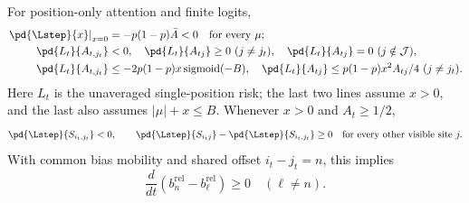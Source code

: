 \begin{lemma}
\label{lem:lr-signs}\label{lem:lr-postrouting-gradient}
For position-only attention and finite logits,
\begin{align}
 \left.\pd{\Lstep}{x}\right|_{x=0}&=-p(1-p)\bar A<0
 \quad\text{for every }\mu;\label{eq:lr-initial-gate-gradient}\\
 \pd{L_t}{A_{t,j_t}}&<0,\quad \pd{L_t}{A_{tj}}\ge0\ (j\ne j_t),
 \quad \pd{L_t}{A_{tj}}=0\ (j\notin\mathcal J),\label{eq:lr-feature-source-signs}\\
 \pd{L_t}{A_{t,j_t}}&\le-2p(1-p)x\operatorname{sigmoid}(-B),\quad
 \pd{L_t}{A_{tj}}\le p(1-p)x^2A_{tj}/4\ (j\ne j_t).
 \label{eq:lr-source-bounds}
\end{align}
Here $L_t$ is the unaveraged single-position risk; the last two lines
assume $x>0$, and the last also assumes $|\mu|+x\le B$.
Whenever $x>0$ and $A_t\ge1/2$,
\begin{equation}\label{eq:lr-score-comparison}
 \pd{\Lstep}{S_{i_t,j_t}}<0,\qquad \pd{\Lstep}{S_{i_tj}}-\pd{\Lstep}{S_{i_t,j_t}}\ge0
 \quad\text{for every other visible site }j.
\end{equation}
With common bias mobility and shared offset $i_t-j_t=n$, this implies
\begin{equation}\label{eq:lr-bias-gap-mono}
 \frac{d}{dt}(b_n^{\mathrm{rel}}-b_\ell^{\mathrm{rel}})\ge0\quad(\ell\ne n).
\end{equation}
\end{lemma}
